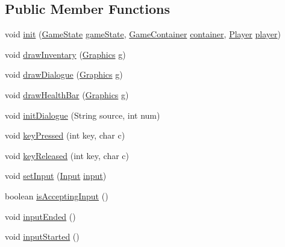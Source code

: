 \subsection*{Public Member Functions}
\begin{DoxyCompactItemize}
\item 
void \mbox{\hyperlink{classgui_1_1_g_u_i_a186759bd878e842374eee4073058bb6b}{init}} (\mbox{\hyperlink{classstates_1_1_game_state}{Game\+State}} \mbox{\hyperlink{classgui_1_1_g_u_i_a3c90a4cfa6b20ea3635bbc7eda176de0}{game\+State}}, \mbox{\hyperlink{classorg_1_1newdawn_1_1slick_1_1_game_container}{Game\+Container}} \mbox{\hyperlink{classgui_1_1_g_u_i_acaa3c69a02ef67d6ebd11fcbcc87049d}{container}}, \mbox{\hyperlink{classentities_1_1_player}{Player}} \mbox{\hyperlink{classgui_1_1_g_u_i_a96b66f816e243b9bae9754fba26f5cd2}{player}})
\item 
void \mbox{\hyperlink{classgui_1_1_g_u_i_a1366abd6d61b9d271363d6c209db2486}{draw\+Inventary}} (\mbox{\hyperlink{classorg_1_1newdawn_1_1slick_1_1_graphics}{Graphics}} g)
\item 
void \mbox{\hyperlink{classgui_1_1_g_u_i_a06a3180f0f9b8f5dfa75729596269107}{draw\+Dialogue}} (\mbox{\hyperlink{classorg_1_1newdawn_1_1slick_1_1_graphics}{Graphics}} g)
\item 
void \mbox{\hyperlink{classgui_1_1_g_u_i_a56b6b966d94e7defa0fa964818091c08}{draw\+Health\+Bar}} (\mbox{\hyperlink{classorg_1_1newdawn_1_1slick_1_1_graphics}{Graphics}} g)
\item 
void \mbox{\hyperlink{classgui_1_1_g_u_i_a40339d6eb368b5d6a0ba455357e04da6}{init\+Dialogue}} (String source, int num)
\item 
void \mbox{\hyperlink{classgui_1_1_g_u_i_a0e860c8c9836a67afdb56ef5fd45d220}{key\+Pressed}} (int key, char c)
\item 
void \mbox{\hyperlink{classgui_1_1_g_u_i_ac2f032af4a8dfc8e6aadbcdc23a9ec39}{key\+Released}} (int key, char c)
\item 
void \mbox{\hyperlink{classgui_1_1_g_u_i_a58f6de4eaf3f446b6a6efd30121091df}{set\+Input}} (\mbox{\hyperlink{classorg_1_1newdawn_1_1slick_1_1_input}{Input}} \mbox{\hyperlink{classgui_1_1_g_u_i_ac55a04087c6c03c6d36d5143e0353c00}{input}})
\item 
boolean \mbox{\hyperlink{classgui_1_1_g_u_i_a0d50e235ccee27aa0e35b860cd5dc883}{is\+Accepting\+Input}} ()
\item 
void \mbox{\hyperlink{classgui_1_1_g_u_i_a7e5dde1e8fb225259f134f132ff9f4fb}{input\+Ended}} ()
\item 
void \mbox{\hyperlink{classgui_1_1_g_u_i_a00cc1291d47fe85ab1dd5ab5c401c0f4}{input\+Started}} ()
\end{DoxyCompactItemize}
